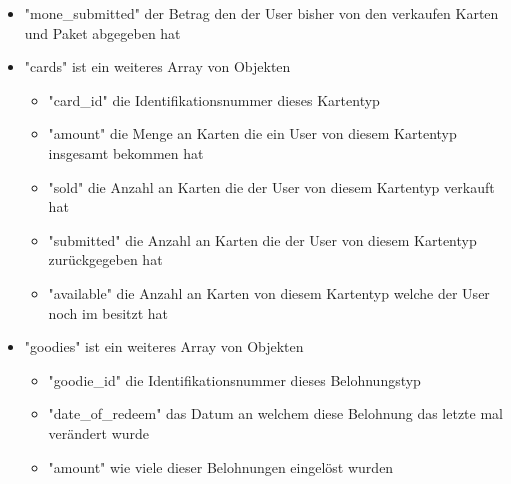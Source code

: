 \documentclass[12pt, letterpaper, twoside]{article}
\begin{document}
\begin{itemize}
\begin{itemize}
						\item "mone\_submitted" der Betrag den der User bisher von den verkaufen Karten und Paket abgegeben hat
						\item "cards" ist ein weiteres Array von Objekten
						\begin{itemize}
							\item "card\_id" die Identifikationsnummer dieses Kartentyp
							\item "amount" die Menge an Karten die ein User von diesem Kartentyp insgesamt bekommen hat
							\item "sold" die Anzahl an Karten die der User von diesem Kartentyp verkauft hat
							\item "submitted" die Anzahl an Karten die der User von diesem Kartentyp zurückgegeben hat
							\item "available" die Anzahl an Karten von diesem Kartentyp welche der User noch im besitzt hat
						\end{itemize}
						\item "goodies" ist ein weiteres Array von Objekten
						\begin{itemize}
							\item "goodie\_id" die Identifikationsnummer dieses Belohnungstyp
							\item "date\_of\_redeem" das Datum an welchem diese Belohnung das letzte mal verändert wurde
							\item "amount" wie viele dieser Belohnungen eingelöst wurden
						\end{itemize}
					\end{itemize}
				\end{itemize}
			
		\newpage
		
\end{document}
